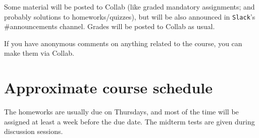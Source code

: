 \documentclass[oneside,11pt]{amsart}
\begin{document}
Some material will be posted to Collab (like graded mandatory assignments; and probably solutions to homeworks/quizzes), but will be also announced in \texttt{Slack}'s \#announcements channel. Grades will be posted to Collab as usual.

If you have anonymous comments on anything related to the course, you can make them via Collab.

\section{Approximate course schedule}

The homeworks are usually due on Thursdays, and most of the time will be assigned at least a week before the due date. The midterm tests are given during discussion sessions.

\vspace{5pt}
\end{document}
